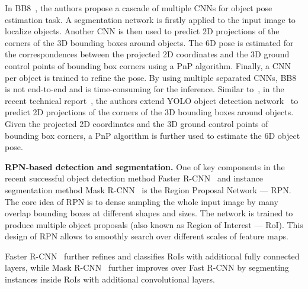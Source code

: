 \documentclass[conference]{IEEEtran}
\newcommand{\junk}[1]{}
\begin{document}
In BB8~\cite{BB8}, the authors propose a cascade of multiple CNNs for object pose estimation task. A segmentation network is firstly applied to the input image to localize objects. Another CNN is then used to predict 2D projections of the corners of the 3D bounding boxes around objects. The 6D pose is estimated for the correspondences between the projected 2D coordinates and the 3D ground control points of 
bounding box corners using a PnP algorithm. Finally, a CNN per object is trained to refine the pose. By using multiple separated CNNs, BB8 is not end-to-end and is time-consuming for the inference. %
Similar to~\cite{BB8}, in the recent technical report~\cite{yolo-6D}, the authors extend YOLO object detection network~\cite{yolo9000} to predict 2D projections of the corners of the 3D bounding boxes around objects. Given the projected 2D coordinates and the 3D ground control points of bounding box corners, a PnP algorithm is further used to estimate the 6D object pose.  

\textbf{RPN-based detection and segmentation.} One of key components in the recent successful object detection method  Faster R-CNN~\cite{Faster-RCNN} and instance segmentation method Mask R-CNN~\cite{Mask-RCNN} is the Region Proposal Network --- RPN. The core idea of RPN is to dense sampling the whole input image by many overlap bounding boxes at different shapes and sizes. The network is trained to produce multiple object proposals (also known as Region of Interest --- RoI). This design of RPN allows to smoothly search over different scales of feature maps. 
\junk{
For each RoI, a fixed-size small feature map (e.g., $7\times7$) is pooled from the image feature map using the RoIPool layer~\cite{RCNN} or RoIAlign layer~\cite{Mask-RCNN}. These layers work by dividing the RoI into a regular grid and then max-pooling the feature map values in each grid cell. In Faster R-CNN, the outputs of the RoIPool layer are used to refine the RoI coordinates and to classify the RoI label. In Mask-RCNN, the outputs of the RoIAlign layer are used not only for refining and recognizing the RoI but also for segmenting the object inside the RoI. %
}
Faster R-CNN~\cite{Faster-RCNN} further refines and classifies RoIs with additional fully connected layers, %
while Mask R-CNN~\cite{Mask-RCNN} further improves over Fast R-CNN by segmenting instances inside RoIs with additional convolutional layers. 
\end{document}

